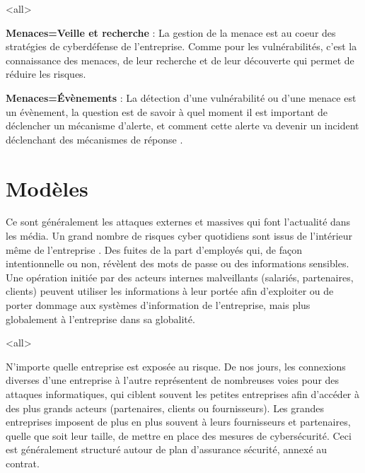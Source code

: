 \mode<all>{
{
\begin{description}
	\item \textbf{Menaces=Veille et recherche} : La gestion de la menace est au coeur des stratégies de cyberdéfense de l'entreprise. Comme pour les vulnérabilités, c'est la connaissance des menaces, de leur recherche et de leur découverte qui permet de réduire les risques.
\item  \textbf{Menaces=Évènements} : La détection d'une vulnérabilité ou d'une menace est un évènement, la question est de savoir à quel moment il est important de déclencher un mécanisme d'alerte, et comment cette alerte va devenir un incident déclenchant des mécanismes de réponse .
\end{description}
}}





\section{Modèles}

Ce sont généralement les attaques externes et massives qui font l’actualité dans les média. 
Un grand nombre de risques cyber quotidiens sont issus de l'intérieur même de l'entreprise .
Des  fuites de la part d'employés qui, de façon intentionnelle ou non, révèlent des mots de passe ou des informations sensibles. Une opération initiée par des acteurs internes malveillants (salariés, partenaires, clients) peuvent utiliser les informations à leur portée afin d’exploiter ou de porter dommage aux systèmes d'information de l’entreprise, mais plus globalement à l'entreprise dans sa globalité.

\mode<all>{}

N’importe quelle entreprise est exposée au risque. De nos jours, les connexions diverses d’une entreprise à l’autre représentent de nombreuses voies pour des attaques informatiques, qui ciblent souvent les petites entreprises afin d’accéder à des plus grands acteurs (partenaires,  clients ou fournisseurs). Les grandes entreprises imposent de plus en plus  souvent à leurs fournisseurs et partenaires, quelle que soit leur taille, de mettre en place des mesures de cybersécurité. Ceci est généralement structuré autour de plan d'assurance sécurité, annexé au contrat.

